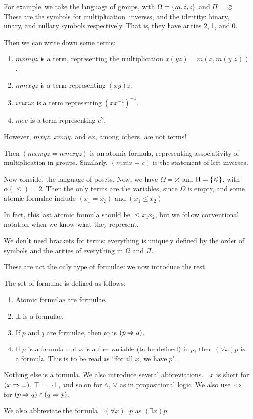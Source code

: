 \documentclass{article}
\begin{document}
\begin{example}
    For example, we take the language of groups, with $\Omega = \left\lbrace m, i, e \right\rbrace$ and $\Pi = \varnothing$. These are the symbols for multiplication, inverses, and the identity: binary, unary, and nullary symbols respectively. That is, they have arities 2, 1, and 0.
    
    Then we can write down some terms:
    \begin{enumerate}
    	\item $mxmyz$ is a term, representing the multiplication $x(yz) = m(x, m(y, z))$.
    	\item $mmxyz$ is a term representing $(xy)z$.
    	\item $imxix$ is a term representing $(xx^{-1})^{-1}$.
    	\item $mee$ is a term representing $e^2$.
	\end{enumerate}
	However, $mxyz$, $xmyy$, and $ex$, among others, are not terms!
	
	Then $(mxmyz = mmxyz)$ is an atomic formula, representing associativity of  multiplication in groups. Similarly, $(mxix = e)$ is the statement of left-inverses.
	
	Now consider the language of posets. Now, we have $\Omega = \varnothing$ and $\Pi = \left\lbrace \leqslant \right\rbrace$, with $\alpha(\leq) = 2$. Then the only terms are the variables, since $\Omega$ is empty, and some atomic formulae include $(x_1 = x_2)$ and $(x_1 \leq x_2)$
	
	In fact, this last atomic formula should be $\leq x_1x_2$, but we follow conventional notation when we know what they represent.
\end{example}

\begin{note}
	We don't need brackets for terms: everything is uniquely defined by the order of symbols and the arities of everything in $\Omega$ and $\Pi$.
\end{note}

These are not the only type of formulae: we now introduce the rest.

\begin{definition}[Formula]
	The set of formulae is defined as follows:
	\begin{enumerate}
    	\item Atomic formulae are formulae.
    	\item $\bot$ is a formulae.
    	\item If $p$ and $q$ are formulae, then so is $(p \Rightarrow q)$.
    	\item If $p$ is a formula and $x$ is a free variable (to be defined) in $p$, then $(\forall x) p$ is a formula. This is to be read as ``for all $x$, we have $p$".
	\end{enumerate}
	Nothing else is a formula. We also introduce several abbreviations. $\lnot x$ is short for $(x \Rightarrow \bot)$, $\top = \lnot \bot$, and so on for $\land$, $\lor$ as in propositional logic. We also use $\Leftrightarrow$ for $(p \Rightarrow q) \land (q \Rightarrow p)$.
	
	We also abbreviate the formula $\lnot (\forall x) \lnot p$ as $(\exists x) p$.
\end{definition}
\end{document}
